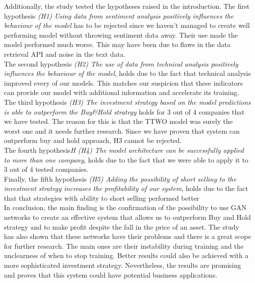 \documentclass[11pt]{article} %
\begin{document}
Additionally, the study tested the hypotheses raised in the introduction. The first hypothesis \textit{(H1) Using data from sentiment analysis positively influences the behaviour of the model} has to be rejected since we haven't managed to create well performing model without throwing sentiment data away. Their use made the model performed much worse. This may have been due to flaws in the data retrieval API and noise in the text data. \\

The second hypothesis\textit{ (H2) The use of data from technical analysis positively influences the behaviour of the model}, holds due to the fact that technical analysis improved every of our models. This matches our suspicion that these indicators can provide our model with additional information and accelerate its training. \\

The third hypothesis\textit{ (H3) The investment strategy based on the model predictions is able to outperform the Buy\&Hold strategy} holds for 3 out of 4 companies that we have tested. The reason for this is that the TTWO model was surely the worst one and it needs further research. Since we have proven that system can outperform buy and hold approach, H3 cannot be rejected.\\

The fourth hypothesis\textit{H (H4) The model architecture can be successfully applied to more than one company}, holds due to the fact that we were able to apply it to 3 out of 4 tested companies. \\


Finally, the fifth hypothesis\textit{ (H5) Adding the possibility of short selling to the investment strategy increases the profitability of our system}, holds due to the fact that that strategies with ability to short selling performed better \\

In conclusion, the main finding is the confirmation of the possibility to use GAN networks to create an effective system that allows us to outperform Buy and Hold strategy and to make profit despite the fall in the price of an asset. The study has also shown that these networks have their problems and there is a great scope for further research. The main ones are their instability during training and the unclearness of when to stop training.  Better results could also be achieved with a more sophisticated investment strategy. Nevertheless, the results are promising and proves that this system could have potential business applications.
\end{document}
